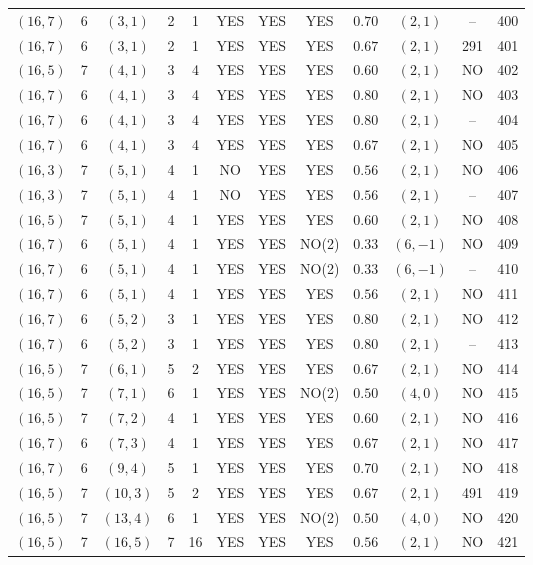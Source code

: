 \begin{longtable}{|c|c|c|c|c|c|c|c|c|c|c|c|}
$(16,7)$ & 6 & $(3,1)$ & 2 & 1 & YES & YES & YES & $0.70$ & $(2,1)$ & -- & 400\\
$(16,7)$ & 6 & $(3,1)$ & 2 & 1 & YES & YES & YES & $0.67$ & $(2,1)$ & 291 & 401\\
$(16,5)$ & 7 & $(4,1)$ & 3 & 4 & YES & YES & YES & $0.60$ & $(2,1)$ & NO & 402\\
$(16,7)$ & 6 & $(4,1)$ & 3 & 4 & YES & YES & YES & $0.80$ & $(2,1)$ & NO & 403\\
$(16,7)$ & 6 & $(4,1)$ & 3 & 4 & YES & YES & YES & $0.80$ & $(2,1)$ & -- & 404\\
$(16,7)$ & 6 & $(4,1)$ & 3 & 4 & YES & YES & YES & $0.67$ & $(2,1)$ & NO & 405\\
$(16,3)$ & 7 & $(5,1)$ & 4 & 1 & NO & YES & YES & $0.56$ & $(2,1)$ & NO & 406\\
$(16,3)$ & 7 & $(5,1)$ & 4 & 1 & NO & YES & YES & $0.56$ & $(2,1)$ & -- & 407\\
$(16,5)$ & 7 & $(5,1)$ & 4 & 1 & YES & YES & YES & $0.60$ & $(2,1)$ & NO & 408\\
$(16,7)$ & 6 & $(5,1)$ & 4 & 1 & YES & YES & NO(2) & $0.33$ & $(6,-1)$ & NO & 409\\
$(16,7)$ & 6 & $(5,1)$ & 4 & 1 & YES & YES & NO(2) & $0.33$ & $(6,-1)$ & -- & 410\\
$(16,7)$ & 6 & $(5,1)$ & 4 & 1 & YES & YES & YES & $0.56$ & $(2,1)$ & NO & 411\\
$(16,7)$ & 6 & $(5,2)$ & 3 & 1 & YES & YES & YES & $0.80$ & $(2,1)$ & NO & 412\\
$(16,7)$ & 6 & $(5,2)$ & 3 & 1 & YES & YES & YES & $0.80$ & $(2,1)$ & -- & 413\\
$(16,5)$ & 7 & $(6,1)$ & 5 & 2 & YES & YES & YES & $0.67$ & $(2,1)$ & NO & 414\\
$(16,5)$ & 7 & $(7,1)$ & 6 & 1 & YES & YES & NO(2) & $0.50$ & $(4,0)$ & NO & 415\\
$(16,5)$ & 7 & $(7,2)$ & 4 & 1 & YES & YES & YES & $0.60$ & $(2,1)$ & NO & 416\\
$(16,7)$ & 6 & $(7,3)$ & 4 & 1 & YES & YES & YES & $0.67$ & $(2,1)$ & NO & 417\\
$(16,7)$ & 6 & $(9,4)$ & 5 & 1 & YES & YES & YES & $0.70$ & $(2,1)$ & NO & 418\\
$(16,5)$ & 7 & $(10,3)$ & 5 & 2 & YES & YES & YES & $0.67$ & $(2,1)$ & 491 & 419\\
$(16,5)$ & 7 & $(13,4)$ & 6 & 1 & YES & YES & NO(2) & $0.50$ & $(4,0)$ & NO & 420\\
$(16,5)$ & 7 & $(16,5)$ & 7 & 16 & YES & YES & YES & $0.56$ & $(2,1)$ & NO & 421\\

\end{longtable}
